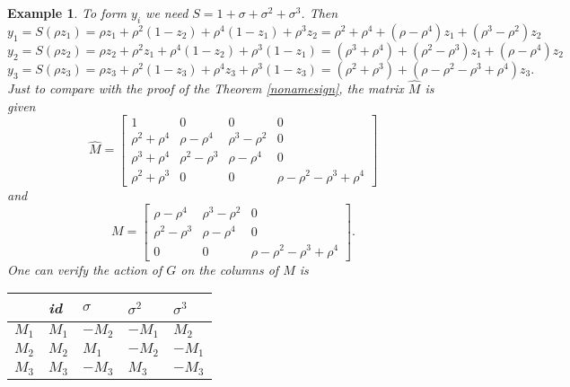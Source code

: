 \documentclass[12pt]{article}
\theoremstyle{plain}
\newtheorem{example}[theorem]{Example}
\begin{document}
\begin{example}
To form $y_i$ we need $S = 1+\sigma + \sigma^2 +\sigma ^3$. Then 
$$y_1 = S(\rho z_1) = \rho z_1 + \rho^2 (1-z_2) + \rho^4 (1-z_1) + \rho^3 z_2 = \rho^2+\rho^4 +(\rho - \rho^4)z_1 + (\rho^3 -\rho^2)z_2 $$ 
$$y_2 = S(\rho z_2) = \rho z_2 + \rho^2 z_1 + \rho^4 (1-z_2) + \rho^3 (1-z_1)= (\rho^3 + \rho^4) + (\rho^2 -\rho^3)z_1+ (\rho-\rho^4)z_2$$
$$y_3 = S(\rho z_3) = \rho z_3 + \rho^2 (1-z_3) + \rho^4 z_3 + \rho^3 (1-z_3)= (\rho^2+\rho^3) + (\rho-\rho^2-\rho^3+\rho^4)z_3.$$
Just to compare with the proof of the Theorem \ref{nonamesign}, the matrix $\hat{M}$ is given 
$$
\hat{M} = \begin{bmatrix}
1 & 0&0&0\\
\rho^2+\rho^4 & \rho -\rho^4 & \rho^3 -\rho^2 & 0\\
\rho^3+\rho^4 & \rho^2 -\rho^3 & \rho -\rho^4 &0 \\
\rho^2+\rho^3 &0 &0 & \rho - \rho^2 -\rho^3+\rho^4
\end{bmatrix}
$$
 and 
 $$
 M = \begin{bmatrix}
 \rho -\rho^4 & \rho^3 -\rho^2 & 0\\
 \rho^2 -\rho^3 & \rho -\rho^4 &0 \\
0 &0 & \rho - \rho^2 -\rho^3+\rho^4
\end{bmatrix}.
$$
One can verify the action of $G$ on the columns of $M$ is 
\begin{table}[H]
\centering
\begin{tabular}{l|llll} 
 & id & $\sigma$ & $\sigma^2$ & $\sigma^3$\\
 \hline
 $M_1$  & $M_1$ & $-M_2$ & $-M_1$ & $M_2$ \\
$M_2$ & $M_2$ & $M_1$ & $-M_2$ & $-M_1$ \\
$M_3$ & $M_3$ & $-M_3$ & $M_3$ & $-M_3$ \\
\end{tabular}
\end{table}
\end{example}


{}
\end{document}
